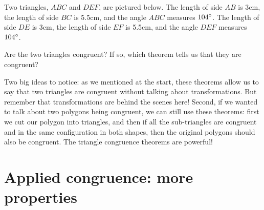 \documentclass{ximera}
\begin{document}
\begin{example} 
Two triangles, $ABC$ and $DEF$, are pictured below. The length of side $AB$ is 3cm, the length of side $BC$ is 5.5cm, and the angle $ABC$ measures $104\degree$.  The length of side $DE$ is 3cm, the length of side $EF$ is 5.5cm, and the angle $DEF$ measures $104\degree$.
\begin{image} \end{image}
Are the two triangles congruent? If so, which theorem tells us that they are congruent?
\begin{multipleChoice}
\end{multipleChoice}
\end{example}

Two big ideas to notice: as we mentioned at the start, these theorems allow us to say that two triangles are congruent without talking about transformations. But remember that transformations are behind the scenes here! Second, if we wanted to talk about two polygons being congruent, we can still use these theorems: first we cut our polygon into triangles, and then if all the sub-triangles are congruent and in the same configuration in both shapes, then the original polygons should also be congruent. The triangle congruence theorems are powerful!




\section{Applied congruence: more properties}
\end{document}
